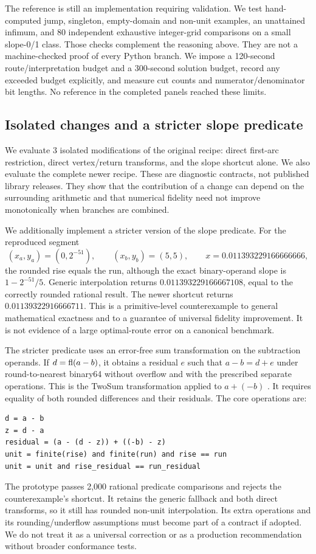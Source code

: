 The reference is still an implementation requiring validation. We test hand-computed jump, singleton, empty-domain and non-unit examples, an unattained infimum, and 80 independent exhaustive integer-grid comparisons on a small slope-0/1 class. Those checks complement the reasoning above. They are not a machine-checked proof of every Python branch. We impose a 120-second route/interpretation budget and a 300-second solution budget, record any exceeded budget explicitly, and measure cut counts and numerator/denominator bit lengths. No reference in the completed panels reached these limits.

\subsection{Isolated changes and a stricter slope predicate}

We evaluate 3 isolated modifications of the original recipe: direct first-arc restriction, direct vertex/return transforms, and the slope shortcut alone. We also evaluate the complete newer recipe. These are diagnostic contracts, not published library releases. They show that the contribution of a change can depend on the surrounding arithmetic and that numerical fidelity need not improve monotonically when branches are combined.

We additionally implement a stricter version of the slope predicate. For the reproduced segment
\begin{equation}
 (x_a,y_a)=(0,2^{-51}),\qquad (x_b,y_b)=(5,5),\qquad x=0.011393229166666666,
\end{equation}
the rounded rise equals the run, although the exact binary-operand slope is $1-2^{-51}/5$. Generic interpolation returns $0.011393229166667108$, equal to the correctly rounded rational result. The newer shortcut returns $0.01139322916666711$. This is a primitive-level counterexample to general mathematical exactness and to a guarantee of universal fidelity improvement. It is not evidence of a large optimal-route error on a canonical benchmark.

The stricter predicate uses an error-free sum transformation on the subtraction operands. If $d=\operatorname{fl}(a-b)$, it obtains a residual $e$ such that $a-b=d+e$ under round-to-nearest binary64 without overflow and with the prescribed separate operations. This is the TwoSum transformation applied to $a+(-b)$ \autocite{ogitaAccurateSum2005}. It requires equality of both rounded differences and their residuals. The core operations are:
\begin{lstlisting}
d = a - b
z = d - a
residual = (a - (d - z)) + ((-b) - z)
unit = finite(rise) and finite(run) and rise == run
unit = unit and rise_residual == run_residual
\end{lstlisting}
The prototype passes 2,000 rational predicate comparisons and rejects the counterexample's shortcut. It retains the generic fallback and both direct transforms, so it still has rounded non-unit interpolation. Its extra operations and its rounding/underflow assumptions must become part of a contract if adopted. We do not treat it as a universal correction or as a production recommendation without broader conformance tests.

